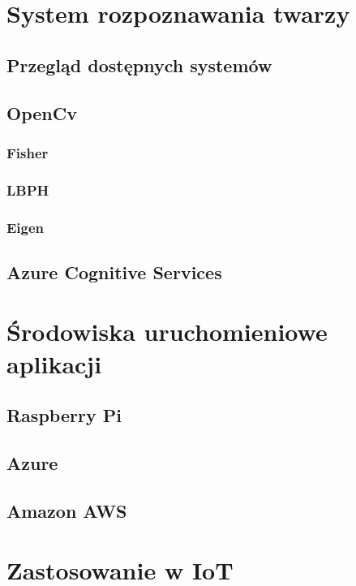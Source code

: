 \documentclass[11pt, a4paper,polish,twoside]{report}
\begin{document}
%

\chapter{System rozpoznawania twarzy} \label{rozpoznawanie_twarzy}
\section{Przegląd dostępnych systemów}
\section{OpenCv}
\subsection{Fisher}
\subsection{LBPH}
\subsection{Eigen}
\section{Azure Cognitive Services}
%

\chapter{Środowiska uruchomieniowe aplikacji}
\section{Raspberry Pi}
\section{Azure}
\section{Amazon AWS}
%

\chapter{Zastosowanie w IoT}
\end{document}
